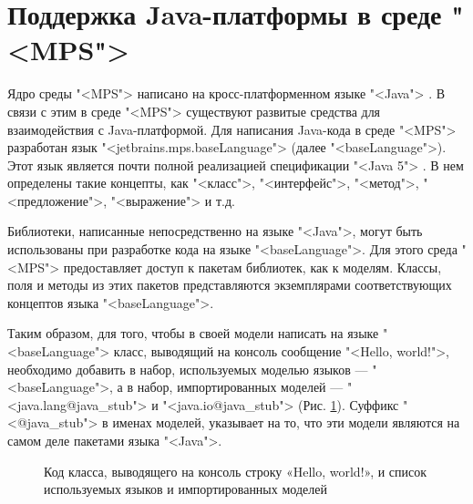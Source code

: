 \section{Поддержка Java-платформы в среде "<MPS">}
Ядро среды "<MPS"> написано на кросс-платформенном языке "<Java"> \cite{eckel}. В связи с этим в среде "<MPS"> существуют развитые средства для взаимодействия с Java-платформой. Для написания Java-кода в среде "<MPS"> разработан язык "<jetbrains.mps.baseLanguage"> (далее "<baseLanguage">). Этот язык является почти полной реализацией спецификации "<Java 5"> \cite{java5spec}. В нем определены такие концепты, как "<класс">, "<интерфейс">, "<метод">, "<предложение">, "<выражение"> и т.д.

Библиотеки, написанные непосредственно на языке "<Java">, могут быть использованы при разработке кода на языке "<baseLanguage">. Для этого среда "<MPS"> предоставляет доступ к пакетам библиотек, как к моделям. Классы, поля и методы из этих пакетов представляются экземплярами соответствующих концептов языка "<baseLanguage">.

Таким образом, для того, чтобы в своей модели написать на языке "<baseLanguage"> класс, выводящий на консоль сообщение "<Hello, world!">, необходимо добавить в набор, используемых моделью языков --- "<baseLanguage">, а в набор, импортированных моделей ---
"<java.lang@java\_stub"> и "<java.io@java\_stub">
(Рис. \ref{fig:Import}). Суффикс "<@java\_stub"> в именах моделей, указывает на то, что эти модели являются на самом деле пакетами языка "<Java">.
\begin{figure}
 \centering
 \caption{Код класса, выводящего на консоль строку «Hello, world!», и список используемых языков и импортированных моделей}
 \label{fig:Import}
\end{figure}
